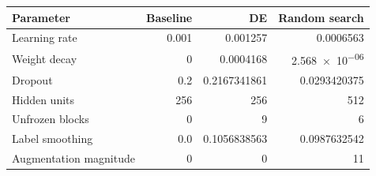 \begin{tabular}{lrrr}
\toprule
Parameter & Baseline & DE & Random search \\
\midrule
Learning rate & \num{0.001} & \num{0.001257} & \num{0.0006563} \\
Weight decay & \num{0} & \num{0.0004168} & \num{2.568e-06} \\
Dropout & 0.2 & 0.2167341861 & 0.0293420375 \\
Hidden units & 256 & 256 & 512 \\
Unfrozen blocks & 0 & 9 & 6 \\
Label smoothing & 0.0 & 0.1056838563 & 0.0987632542 \\
Augmentation magnitude & 0 & 0 & 11 \\
\bottomrule
\end{tabular}
